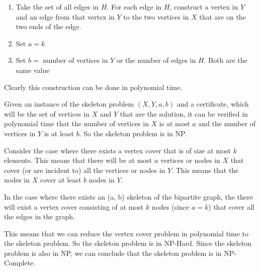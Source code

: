 \documentclass[paper=a4, fontsize=11pt]{scrartcl} %
\numberwithin{figure}{section} %
\numberwithin{table}{section} %
\begin{document}
\begin{enumerate}
\begin{enumerate}
\item Take the set of all edges in $H$. For each edge in $H$, construct a vertex in $Y$ and an edge from that vertex in $Y$ to the two vertices in $X$ that are on the two ends of the edge.

\item Set $a = k$

\item Set $b =$ number of vertices in $Y$ or the number of edges in $H$. Both are the same value

\end{enumerate}

Clearly this construction can be done in polynomial time. 

Given an instance of the skeleton problem $(X, Y, a, b)$ and a certificate, which will be the set of vertices in $X$ and $Y$ that are the solution, it can be verified in polynomial time that the number of vertices in $X$ is at most $a$ and the number of vertices in $Y$ is at least $b$. So the skeleton problem is in NP.

Consider the case where there exists a vertex cover that is of size at most $k$ elements. This means that there will be at most $a$ vertices or nodes in $X$ that cover (or are incident to) all the vertices or nodes in $Y$. This means that the nodes in $X$ cover at least $b$ nodes in $Y$.

In the case where there exists an (a, b) skeleton of the bipartite graph, the there will exist a vertex cover consisting of at most $k$ nodes (since $a=k$) that cover all the edges in the graph.

This means that we can reduce the vertex cover problem in polynomial time to the skeleton problem. So the skeleton problem is in NP-Hard. Since the skeleton problem is also in NP, we can conclude that the skeleton problem is in NP-Complete.

\end{enumerate}

\end{document}
